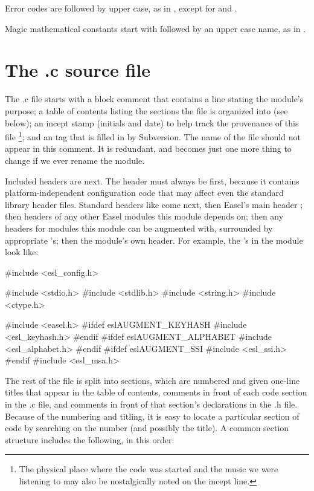Error codes are  followed by upper case, as in
, except for  and .

Magic mathematical constants start with  followed by
an upper case name, as in .





\section{The .c source file}

The .c file starts with a block comment that contains a line stating
the module's purpose; a table of contents listing the sections the
file is organized into (see below); an incept stamp (initials and
date) to help track the provenance of this file \footnote{The physical
place where the code was started and the music we were listening to
may also be nostalgically noted on the incept line.}; and an
 tag that is filled in by Subversion.  The name of
the file should not appear in this comment. It is redundant, and
becomes just one more thing to change if we ever rename the module.

Included headers are next. The  header must
always be first, because it contains platform-independent
configuration code that may affect even the standard library header
files. Standard headers like  come next, then Easel's
main header ; then headers of any other Easel modules
this module depends on; then any headers for modules this module can
be augmented with, surrounded by appropriate 's; then
the module's own header. For example, the 's in the
 module look like:

\begin{cchunk}
#include <esl_config.h>

#include <stdio.h>
#include <stdlib.h>
#include <string.h>
#include <ctype.h>

#include <easel.h>
#ifdef eslAUGMENT_KEYHASH
#include <esl_keyhash.h>
#endif
#ifdef eslAUGMENT_ALPHABET
#include <esl_alphabet.h>
#endif
#ifdef eslAUGMENT_SSI
#include <esl_ssi.h>
#endif
#include <esl_msa.h>
\end{cchunk}

The rest of the file is split into sections, which are numbered and
given one-line titles that appear in the table of contents, comments
in front of each code section in the .c file, and comments in front of
that section's declarations in the .h file. Because of the numbering
and titling, it is easy to locate a particular section of code by
searching on the number (and possibly the title).  A common section
structure includes the following, in this order:

